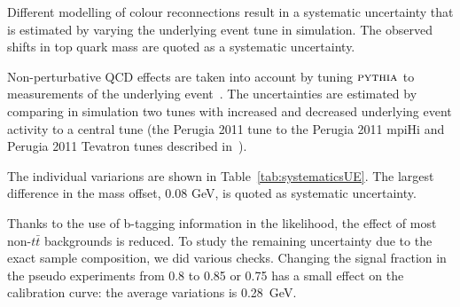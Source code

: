 \begin{description}[wide=\parindent]


\item [Colour reconnection.] Different modelling of colour reconnections \autocite{colour_reconnection} result in a
systematic uncertainty that is estimated by varying the underlying event tune in simulation. The observed shifts in top
quark mass are quoted as a systematic uncertainty.

\item [Underlying event.] Non-perturbative QCD effects are taken into account by tuning $\textsc {pythia}$ to
measurements of the underlying event~\cite{Chatrchyan:2011id}. The uncertainties are estimated by comparing in
simulation two tunes with increased and decreased underlying event activity to a central tune (the Perugia 2011 tune to
the Perugia 2011 mpiHi and Perugia 2011 Tevatron tunes described in~\cite{Skands:2010ak}).

The individual variarions are shown in Table~\ref{tab:systematicsUE}. The largest difference in the mass offset,
0.08 GeV, is quoted as systematic uncertainty. 

\item [Background modelling.]
Thanks to the use of b-tagging information in the likelihood, the effect of most non-$t \bar t$ backgrounds is reduced.
To study the remaining uncertainty due to the exact sample composition, we did various checks. Changing the signal
fraction in the pseudo experiments from 0.8 to 0.85 or 0.75 has a small effect on the calibration curve: the average
variations is 0.28~GeV.


\end{description}

